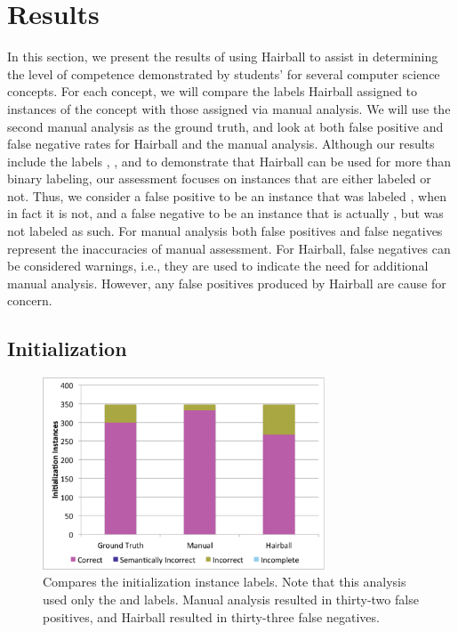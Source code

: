 \section{Results}

In this section, we present the results of using Hairball to assist in
determining the level of competence demonstrated by students'  for
several computer science concepts. For each concept, we will compare the labels
Hairball assigned to instances of the concept with those assigned via manual
analysis. We will use the second manual analysis as the ground truth, and look
at both false positive and false negative rates for Hairball and the manual
analysis. Although our results include the labels \semincor{}, \incor{}, and
\incom{} to demonstrate that Hairball can be used for more than binary
labeling, our assessment focuses on instances that are either labeled
\correct{} or not. Thus, we consider a false positive to be an instance that
was labeled \correct{}, when in fact it is not, and a false negative to be an
instance that is actually \correct{}, but was not labeled as such. For manual
analysis both false positives and false negatives represent the inaccuracies of
manual assessment. For Hairball, false negatives can be considered warnings,
i.e., they are used to indicate the need for additional manual
analysis. However, any false positives produced by Hairball are cause for
concern.


\subsection{Initialization}
\begin{figure}[!t]
\centering
\includegraphics[trim=.3in .15in .3in .15in, clip,
  width=3.3in]{graphs/AutoInit.eps}
\caption{Compares the initialization instance labels. Note that this analysis
  used only the \correct{} and \incor{} labels. Manual analysis resulted in
  thirty-two false positives, and Hairball resulted in thirty-three false
  negatives.}
\end{figure}

